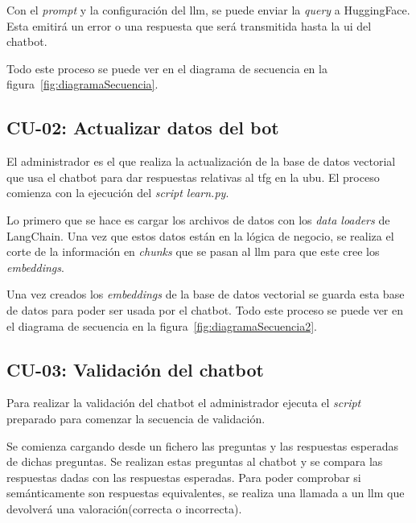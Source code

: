 Con el \textit{prompt} y la configuración del \acrshort{llm}, se puede enviar la \textit{query} a HuggingFace. Esta emitirá un error o una respuesta que será transmitida hasta la \acrshort{ui} del chatbot. 

Todo este proceso se puede ver en el diagrama de secuencia en la figura~\ref{fig:diagramaSecuencia}.


\newpage
\subsection{CU-02: Actualizar datos del bot}

El administrador es el que realiza la actualización de la base de datos vectorial que usa el chatbot para dar respuestas relativas al \acrshort{tfg} en la \acrshort{ubu}. El proceso comienza con la ejecución del \textit{script learn.py}.

Lo primero que se hace es cargar los archivos de datos con los \textit{data loaders} de LangChain. Una vez que estos datos están en la lógica de negocio, se realiza el corte de la información en \textit{chunks} que se pasan al \acrshort{llm} para que este cree los \textit{embeddings}.

Una vez creados los \textit{embeddings} de la base de datos vectorial se guarda esta base de datos para poder ser usada por el chatbot. Todo este proceso se puede ver en el diagrama de secuencia en la figura~\ref{fig:diagramaSecuencia2}.



\newpage
\subsection{CU-03: Validación del chatbot}

Para realizar la validación del chatbot el administrador ejecuta el \textit{script} preparado para comenzar la secuencia de validación.

Se comienza cargando desde un fichero las preguntas y las respuestas esperadas de dichas preguntas. Se realizan estas preguntas al chatbot y se compara las respuestas dadas con las respuestas esperadas. Para poder comprobar si semánticamente son respuestas equivalentes, se realiza una llamada a un \acrshort{llm} que devolverá una valoración(correcta o incorrecta).

